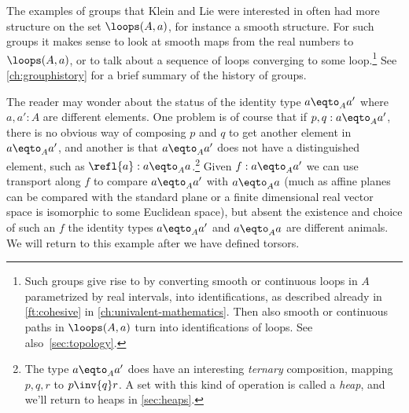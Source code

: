 The examples of groups that Klein and Lie were interested in
often had more structure on the set $\loops(A,a)$,
for instance a smooth structure.
For such groups it makes sense to look at smooth maps from the real numbers
to $\loops(A,a)$,
or to talk about a sequence of loops converging to some loop.\footnote{%
  Such groups give rise to \inftygps by converting
  smooth or continuous loops in $A$
  parametrized by real intervals,
  into identifications,
  as described already in \cref{ft:cohesive}
  in \cref{ch:univalent-mathematics}.
  Then also smooth or continuous paths in $\loops(A,a)$
  turn into identifications of loops.
  See also~\cref{sec:topology}.}
See \cref{ch:grouphistory} for a brief summary of the history of groups.

\begin{remark}\label{rem:heap-preview}
  The reader may wonder about the status of the identity type $a\eqto_Aa'$ where $a,a':A$ are different elements.
  One problem is of course that if $p,q:a\eqto_Aa'$,
  there is no obvious way of composing $p$ and $q$
  to get another element in $a\eqto_A a'$,
  and another is that $a\eqto_Aa'$ does not have a distinguished element,
  such as $\refl{a}:a\eqto_Aa$.\footnote{%
    The type $a\eqto_A a'$ does have an interesting \emph{ternary}
    composition, mapping $p,q,r$ to $p\inv{q}r$.
    A set with this kind of operation is called a \emph{heap},
    and we'll return to heaps in \cref{sec:heaps}.}
Given $f:a\eqto_Aa'$ we can use transport along $f$ to compare $a\eqto_Aa'$ with $a\eqto_Aa$ (much as affine planes can be compared with the standard plane or a finite dimensional real vector space is isomorphic to some Euclidean space), but absent the existence and choice of such an $f$ the identity types $a\eqto_Aa'$ and $a\eqto_Aa$ are different animals.
We will return to this example after we have defined torsors.
\end{remark}


